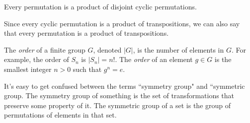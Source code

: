 \documentclass[class=article, crop=false]{standalone}
\begin{document}
\par
\begin{lem}
    Every permutation is a product of disjoint cyclic permutations.
\end{lem}
\begin{cor}
    Since every cyclic permutation is a product of transpositions, we can also say that every permutation is a product of transpositions.
\end{cor}
\par
The \emph{order} of a finite group $G$, denoted $|G|$, is the number of elements in $G$. For example, the order of $S_n$ is $|S_n|=n!$. The \emph{order} of an element $g \in G$ is the smallest integer $n>0$ such that $g^n=e$.
\begin{note}
    It's easy to get confused between the terms ``symmetry group" and ``symmetric group. The symmetry group of something is the set of transformations that preserve some property of it. The symmetric group of a set is the group of permutations of elements in that set.
\end{note}
\end{document}

